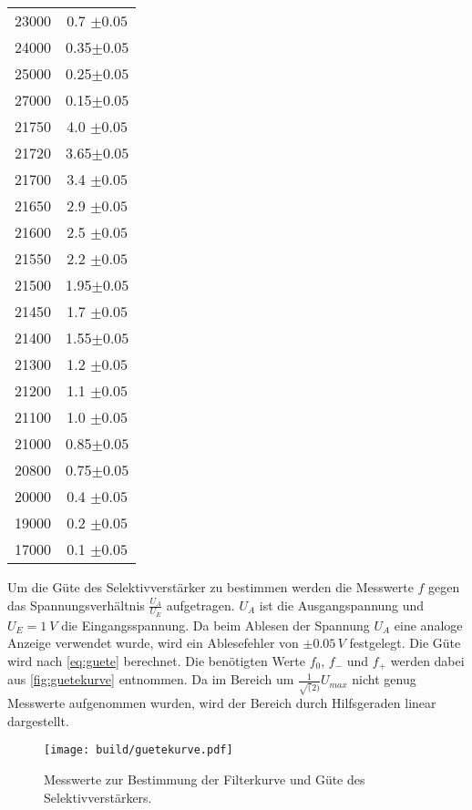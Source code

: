 \begin{table}[H]
\begin{tabular}{c c}
      23000 & 0.7 $\pm 0.05$\\
      24000 & 0.35$\pm 0.05$ \\
      25000 & 0.25$\pm 0.05$ \\
      27000 & 0.15$\pm 0.05$ \\
      21750 & 4.0 $\pm 0.05$\\
      21720 & 3.65$\pm 0.05$ \\
      21700 & 3.4 $\pm 0.05$\\
      21650 & 2.9 $\pm 0.05$\\
      21600 & 2.5 $\pm 0.05$\\
      21550 & 2.2 $\pm 0.05$\\
      21500 & 1.95$\pm 0.05$ \\
      21450 & 1.7 $\pm 0.05$\\
      21400 & 1.55$\pm 0.05$ \\
      21300 & 1.2 $\pm 0.05$\\
      21200 & 1.1 $\pm 0.05$\\
      21100 & 1.0 $\pm 0.05$\\
      21000 & 0.85$\pm 0.05$ \\
      20800 & 0.75$\pm 0.05$ \\
      20000 & 0.4 $\pm 0.05$\\
      19000 & 0.2 $\pm 0.05$\\
      17000 & 0.1 $\pm 0.05$\\
      \bottomrule
  \end{tabular}
  \label{tab:guete}
\end{table}

Um die Güte des Selektivverstärker zu bestimmen werden die Messwerte $f$ gegen das Spannungsverhältnis $\frac{U_A}{U_E}$ aufgetragen. $U_A$ ist die 
Ausgangspannung und $U_E = \SI{1}{V}$ die Eingangsspannung. Da beim Ablesen der Spannung $U_A$ eine analoge Anzeige verwendet wurde, wird ein Ablesefehler von $\pm 0.05\,\unit{V}$ festgelegt.
Die Güte wird nach \autoref{eq:guete} berechnet. 
Die benötigten Werte $f_0$, $f_{-}$ und $f_{+}$ werden dabei aus \autoref{fig:guetekurve} entnommen. Da im Bereich um $\frac{1}{\sqrt(2)}U_{max}$ nicht genug Messwerte
aufgenommen wurden, wird der Bereich durch Hilfsgeraden linear dargestellt.

\begin{figure}[H]
  \centering
  \texttt{[image: build/guetekurve.pdf]}
  \caption{Messwerte zur Bestimmung der Filterkurve und Güte des Selektivverstärkers.}
  \label{fig:guetekurve}
\end{figure}

